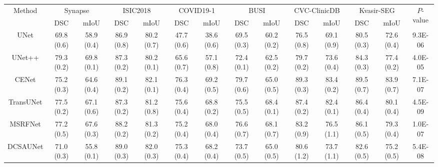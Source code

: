 \begin{table*}[t]
    \centering
    \scriptsize
    \setlength\tabcolsep{5.0pt} %
    \begin{tabular}{c|cc|cc|cc|cc|cc|cc|c}
    \hline
    \multicolumn{1}{c|}{\multirow{2}{*}{Method}} & \multicolumn{2}{c|}{Synapse \cite{Synapse_dataset}} & \multicolumn{2}{c|}{ISIC2018 \cite{gutman2016skin}} & \multicolumn{2}{c|}{COVID19-1 \cite{ma_jun_2020_3757476}} & \multicolumn{2}{c|}{BUSI \cite{al2020dataset}} & \multicolumn{2}{c}{CVC-ClinicDB \cite{bernal2015wm}} & \multicolumn{2}{c|}{Kvasir-SEG \cite{jha2020kvasir}} & \multicolumn{1}{c}{\multirow{2}{*}{$P$-value}} \\ \cline{2-13}
     & DSC & mIoU & DSC & mIoU & DSC & mIoU & DSC & mIoU & DSC & mIoU & DSC & mIoU & \\
     \hline
     UNet \cite{ronneberger2015u}         & 69.8 \tiny{(0.6)} & 58.9 \tiny{(0.4)} & 86.9 \tiny{(0.8)} & 80.2 \tiny{(0.7)} & 47.7 \tiny{(0.6)} & 38.6 \tiny{(0.6)} & 69.5 \tiny{(0.3)} & 60.2 \tiny{(0.2)} & 76.5 \tiny{(0.8)} & 69.1 \tiny{(0.9)} & 80.5 \tiny{(0.3)} & 72.6 \tiny{(0.4)} &  9.3E-06 \\
     UNet++ \cite{zhou2018unet++}         & 79.3 \tiny{(0.2)} & 69.8 \tiny{(0.1)} & 87.3 \tiny{(0.2)} & 80.2 \tiny{(0.1)} & 65.6 \tiny{(0.7)} & 57.1 \tiny{(0.8)} & 72.4 \tiny{(0.1)} & 62.5 \tiny{(0.2)} & 79.7 \tiny{(0.2)} & 73.6 \tiny{(0.4)} & 84.3 \tiny{(0.3)} & 77.4 \tiny{(0.2)} &  4.0E-05 \\
     CENet \cite{gu2019net}            & 75.2 \tiny{(0.3)} & 64.6 \tiny{(0.4)} & 89.1 \tiny{(0.2)} & 82.1 \tiny{(0.1)} & 76.3 \tiny{(0.4)} & 69.2 \tiny{(0.5)} & 79.7 \tiny{(0.6)} & 65.0 \tiny{(0.5)} & 89.3 \tiny{(0.3)} & 83.4 \tiny{(0.2)} & 89.5 \tiny{(0.7)} & 83.9 \tiny{(0.7)} &  7.1E-07  \\
     TransUNet \cite{chen2021transunet}      & 77.5 \tiny{(0.2)} & 67.1 \tiny{(0.6)} & 87.3 \tiny{(0.2)} & 81.2 \tiny{(0.8)} & 75.6 \tiny{(0.4)} & 68.8 \tiny{(0.2)} & 75.5 \tiny{(0.5)} & 68.4 \tiny{(0.1)} & 87.4 \tiny{(0.2)} & 82.4 \tiny{(0.1)} & 86.4 \tiny{(0.4)} & 80.1 \tiny{(0.4)} & 4.5E-09 \\
     MSRFNet \cite{srivastava2021msrf}          & 77.2 \tiny{(0.5)} & 67.6 \tiny{(0.3)} & 88.2 \tiny{(0.2)} & 81.3 \tiny{(0.2)} & 75.2 \tiny{(0.4)} & 68.0 \tiny{(0.4)} & 76.6 \tiny{(0.7)} & 68.1 \tiny{(0.7)} & 83.2 \tiny{(0.9)} & 76.5 \tiny{(1.1)} & 86.1 \tiny{(0.5)} & 79.3 \tiny{(0.4)} & 1.0E-07 \\
     DCSAUNet \cite{xu2023dcsau}         & 71.0 \tiny{(0.3)} & 55.8 \tiny{(0.1)} & 89.0 \tiny{(0.3)} & 82.0 \tiny{(0.3)} & 75.3 \tiny{(0.4)} & 68.2 \tiny{(0.4)} & 73.7 \tiny{(0.5)} & 65.0 \tiny{(0.5)} & 80.6 \tiny{(1.2)} & 73.7 \tiny{(1.1)} & 82.6 \tiny{(0.5)} & 75.2 \tiny{(0.5)} & 5.4E-08 \\

\end{tabular}
\end{table*}
